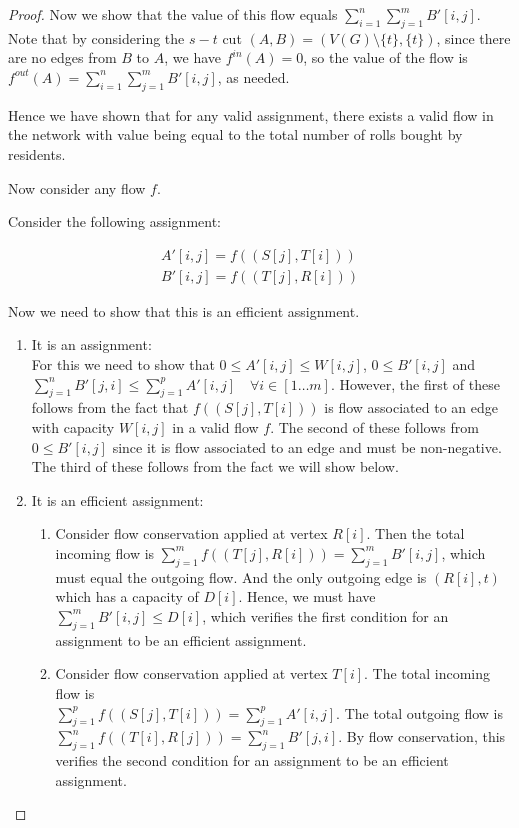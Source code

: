 \documentclass[answers]{exam}
\newcommand{\nl}{\vspace{0.2cm}\\}
\begin{document}
\begin{questions}
\begin{solution}
\begin{proof}
Now we show that the value of this flow equals $\sum_{i = 1}^n \sum_{j = 1}^m B'[i, j]$. Note that by considering the $s-t$ cut $(A, B) = (V(G)\setminus\{t\},\{t\})$, since there are no edges from $B$ to $A$, we have $f^{in}(A) = 0$, so the value of the flow is $f^{out}(A) = \sum_{i = 1}^n \sum_{j = 1}^m B'[i, j]$, as needed.

Hence we have shown that for any valid assignment, there exists a valid flow in the network with value being equal to the total number of rolls bought by residents.

Now consider any flow $f$.

Consider the following assignment:

\begin{align}
    A'[i, j] = f((S[j], T[i]))\\
    B'[i, j] = f((T[j], R[i]))
\end{align}

Now we need to show that this is an efficient assignment.

\begin{enumerate}
    \item It is an assignment:\nl
    For this we need to show that $0 \le A'[i, j] \le W[i, j]$, $0 \le B'[i, j]$ and $\sum_{j = 1}^n B'[j, i] \le \sum_{j = 1}^p A'[i, j] \quad \forall i \in [1\ldots m]$.
    However, the first of these follows from the fact that $f((S[j], T[i]))$ is flow associated to an edge with capacity $W[i, j]$ in a valid flow $f$. The second of these follows from $0 \le B'[i, j]$ since it is flow associated to an edge and must be non-negative.
    The third of these follows from the fact we will show below.
    \item It is an efficient assignment:
        \begin{enumerate}
            \item Consider flow conservation applied at vertex $R[i]$. Then the total incoming flow is $\sum_{j = 1}^m f((T[j], R[i])) = \sum_{j = 1}^m B'[i, j]$, which must equal the outgoing flow. And the only outgoing edge is $(R[i], t)$ which has a capacity of $D[i]$. Hence, we must have $\sum_{j = 1}^m B'[i, j] \le D[i]$, which verifies the first condition for an assignment to be an efficient assignment.
            \item Consider flow conservation applied at vertex $T[i]$. The total incoming flow is \\$\sum_{j = 1}^p f((S[j], T[i])) = \sum_{j = 1}^p A'[i, j]$. The total outgoing flow is $\sum_{j = 1}^n f((T[i], R[j])) = \sum_{j = 1}^n B'[j, i]$. By flow conservation, this verifies the second condition for an assignment to be an efficient assignment.
        \end{enumerate}
\end{enumerate}


\end{proof}
\end{solution}
\end{questions}
\end{document}
